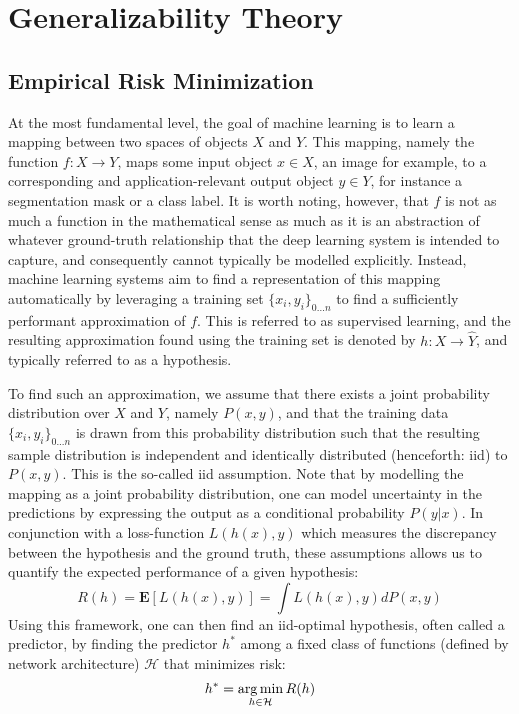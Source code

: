 \section{Generalizability Theory}
	\subsection{Empirical Risk Minimization} 
	
		At the most fundamental level, the goal of machine learning is to learn a mapping between two spaces of objects \(X\) and \(Y\). This mapping, namely the function \(f: X \rightarrow Y\), maps some input object \(x \in X\), an image for example, to a corresponding and application-relevant output object \(y \in Y\), for instance a segmentation mask or a class label. It is worth noting, however, that \(f\) is not as much a function in the mathematical sense as much as it is an abstraction of whatever ground-truth relationship that the deep learning system is intended to capture, and consequently cannot typically be modelled explicitly. Instead, machine learning systems aim to find a representation of this mapping automatically by leveraging a training set \(\{x_i, y_i\}_{0...n}\) to find a sufficiently performant approximation of \(f\). This is referred to as supervised learning, and the resulting approximation found using the training set is denoted by \(h: X \rightarrow \hat{Y}\), and typically referred to as a hypothesis.  
		        
		To find such an approximation, we assume that there exists a joint probability distribution over \(X\) and \(Y\), namely \(P(x,y)\), and that the training data \(\{x_i, y_i\}_{0...n}\) is drawn from this probability distribution such that the resulting sample distribution is independent and identically distributed (henceforth: iid) to \(P(x,y)\). This is the so-called iid assumption. Note that by modelling the mapping as a joint probability distribution, one can model uncertainty in the predictions by expressing the output as a conditional probability \(P(y|x)\). In conjunction with a loss-function \(L(h(x),y)\) which measures the discrepancy between the hypothesis and the ground truth, these assumptions allows us to quantify the expected performance of a given hypothesis:
		\begin{equation}
		    R(h) = \boldsymbol{E}[L(h(x),y)] = \int L(h(x),y) dP(x,y)
		\end{equation}
		Using this framework, one can then find an iid-optimal hypothesis, often called a predictor, by finding the predictor \(h^*\) among a fixed class of functions (defined by network architecture) \(\mathcal{H}\) that minimizes risk:
		\begin{equation}
		h^* = \operatorname*{arg\,min}_{h \in \mathcal{H}}R(h)
		\end{equation}
		
